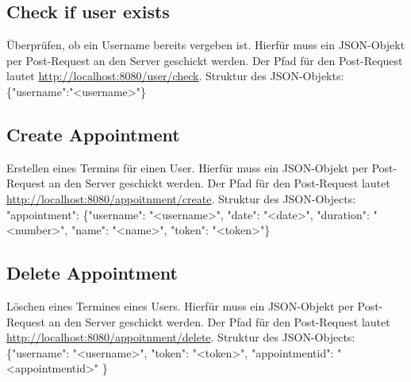 \documentclass[12pt]{scrartcl}
\begin{document}
    \subsection{Check if user exists}
        Überprüfen, ob ein Username bereits vergeben ist.
        Hierfür muss ein JSON-Objekt per Post-Request an den Server geschickt werden. Der Pfad für den Post-Request lautet
        \url{http://localhost:8080/user/check}.
        Struktur des JSON-Objekts: \{"username":"<username>"\}

    \subsection{Create Appointment}
        Erstellen eines Termins für einen User.
        Hierfür muss ein JSON-Objekt per Post-Request an den Server geschickt werden. Der Pfad für den Post-Request lautet
        \url{http://localhost:8080/appoitnment/create}.
        Struktur des JSON-Objects: {"appointment": \{"username": "<username>", "date": "<date>", "duration": "<number>", "name": "<name>"}, "token": "<token>"\}

    \subsection{Delete Appointment}
        Löschen eines Termines eines Users.
        Hierfür muss ein JSON-Objekt per Post-Request an den Server geschickt werden. Der Pfad für den Post-Request lautet
        \url{http://localhost:8080/appoitnment/delete}.
        Struktur des JSON-Objects: \{"username": "<username>", "token": "<token>", "appointmentid": "<appointmentid>" \}
\end{document}
